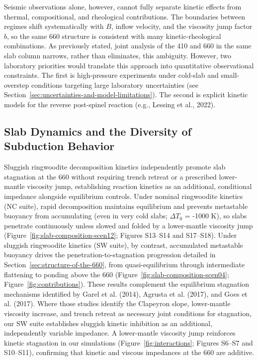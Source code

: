 \documentclass[draft,linenumbers]{agujournal2019}
\begin{document}
Seismic observations alone, however, cannot fully separate kinetic
effects from thermal, compositional, and rheological contributions. The
boundaries between regimes shift systematically with \(B\), inflow
velocity, and the viscosity jump factor \(b\), so the same 660 structure
is consistent with many kinetic-rheological combinations. As previously
stated, joint analysis of the 410 and 660 in the same slab column
narrows, rather than eliminates, this ambiguity. However, two laboratory
priorities would translate this approach into quantitative observational
constraints. The first is high-pressure experiments under cold-slab and
small-overstep conditions targeting large laboratory uncertainties (see
Section~\ref{sec:uncertainties-and-model-limitations}). The second is
explicit kinetic models for the reverse post-spinel reaction (e.g.,
Lessing et al., 2022).

\subsection{Slab Dynamics and the Diversity of Subduction
Behavior}\label{sec:slab-dynamics-and-the-diversity-of-subduction-behavior}

Sluggish ringwoodite decomposition kinetics independently promote slab
stagnation at the 660 without requiring trench retreat or a prescribed
lower-mantle viscosity jump, establishing reaction kinetics as an
additional, conditional impedance alongside equilibrium controls. Under
nominal ringwoodite kinetics (NC suite), rapid decomposition maintains
equilibrium and prevents metastable buoyancy from accumulating (even in
very cold slabs; \(\Delta T_0\) = -1000 K), so slabs penetrate
continuously unless slowed and folded by a lower-mantle viscosity jump
(Figure~\ref{fig:slab-composition-scen12}; Figures S13--S14 and
S17--S18). Under sluggish ringwoodite kinetics (SW suite), by contrast,
accumulated metastable buoyancy drives the penetration-to-stagnation
progression detailed in Section~\ref{sec:structure-of-the-660}, from
quasi-equilibrium through intermediate flattening to ponding above the
660 (Figure~\ref{fig:slab-composition-scen04};
Figure~\ref{fig:contributions}). These results complement the
equilibrium stagnation mechanisms identified by Garel et al. (2014),
{Agrusta et al.} (2017), and {Goes et al.} (2017). Where those studies
identify the Clapeyron slope, lower-mantle viscosity increase, and
trench retreat as necessary joint conditions for stagnation, our SW
suite establishes sluggish kinetic inhibition as an additional,
independently variable impedance. A lower-mantle viscosity jump
reinforces kinetic stagnation in our simulations
(Figure~\ref{fig:interactions}; Figures S6--S7 and S10--S11), confirming
that kinetic and viscous impedances at the 660 are additive.
\end{document}
